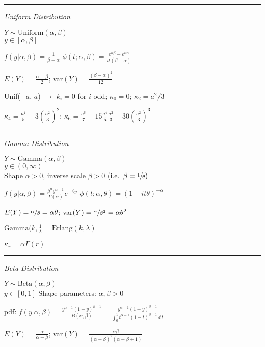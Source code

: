 \documentclass[notitlepage,10pt,twocolumn]{article}
\begin{document}
\vspace{.15cm}\hrule \vspace{.15cm}

\emph{\sffamily Uniform Distribution}

$Y \sim \text{Uniform}(\alpha,\beta)$\\
	$y\in [\alpha,\beta]$

$f(y|\alpha,\beta) = \frac{1}{\beta-\alpha}$ \quad $\phi(t;\alpha,\beta) = \frac{e^{it\beta}-e^{it\alpha}}{it(\beta-\alpha)}$

$E(Y) = \frac{\alpha + \beta}{2}$; var$(Y) = \frac{(\beta-\alpha)^2}{12}$

Unif($-a$, $a$) $\to$ $k_i = 0$ for $i$ odd; $\kappa_0 = 0$; $\kappa_2=a^2/3$

$\kappa_4 = \frac{a^4}{5}-3\left(\frac{a^2}{3}\right)^2$; $\kappa_6 = \frac{a^6}{7}-15\frac{a^4}{5}\frac{a^2}{3}+30\left(\frac{a^2}{3}\right)^3$

\vspace{.15cm}\hrule \vspace{.15cm}

\emph{\sffamily Gamma Distribution}

$Y \sim \text{Gamma}(\alpha,\beta)$\\
	$y\in(0,\infty)$\\
	Shape $\alpha > 0$, inverse scale $\beta > 0$ (i.e.\ $\beta = \sfrac{1}{\theta})$

$f(y|\alpha,\beta) = \frac{\beta^\alpha y^{\alpha-1}}{\Gamma(\alpha)}e^{-\beta y}$ \quad $\phi(t;\alpha,\theta)=(1-it\theta)^{-\alpha}$

$E(Y) = \sfrac{\alpha}{\beta} = \alpha\theta$; var$(Y) = \sfrac{\alpha}{\beta^2}=\alpha \theta^2$

$\text{Gamma}(k,\frac{1}{\lambda} = \text{Erlang}(k,\lambda)$

$\kappa_r = \alpha \Gamma(r)$

\vspace{.15cm}\hrule \vspace{.15cm}

\emph{\sffamily Beta Distribution}

$Y \sim \text{Beta}(\alpha, \beta)$\\
	$y \in [0,1]$\quad
	Shape parameters: $\alpha, \beta > 0$

pdf: $f(y|\alpha,\beta) = \frac{y^{\alpha-1}(1-y)^{\beta -1}}{B(\alpha,\beta)} = \frac{y^{\alpha-1}(1-y)^{\beta -1}}{\int_{0}^{1}t^{\alpha-1}(1-t)^{\beta -1}\; \textrm{d}t}$

$E(Y) = \frac{\alpha}{\alpha+\beta}$; var$(Y) = \frac{\alpha\beta}{(\alpha+\beta)^2(\alpha + \beta +1)}$
\end{document}
